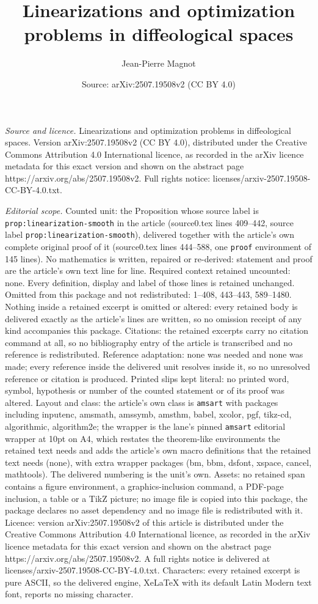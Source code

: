 \documentclass[10pt,a4paper]{amsart}
\title[Linearizations and optimization problems in diffeological sp]{Linearizations and optimization problems in diffeological spaces}
\author{Jean-Pierre Magnot}
\date{Source: arXiv:2507.19508v2 (CC BY 4.0)}
\begin{document}
\maketitle

\noindent\emph{Source and licence.} Linearizations and optimization problems in diffeological spaces. Version arXiv:2507.19508v2 (CC BY 4.0), distributed under the Creative Commons Attribution 4.0 International licence, as recorded in the arXiv licence metadata for this exact version and shown on the abstract page https://arxiv.org/abs/2507.19508v2. Full rights notice: licenses/arxiv-2507.19508-CC-BY-4.0.txt.\par\smallskip

\noindent\textit{Editorial scope.} Counted unit: the Proposition whose source label is \texttt{prop:linearization-smooth} in the article (source0.tex lines 409--442, source label \texttt{prop:linearization-smooth}), delivered together with the article's own complete original proof of it (source0.tex lines 444--588, one \texttt{proof} environment of 145 lines). No mathematics is written, repaired or re-derived: statement and proof are the article's own text line for line. Required context retained uncounted: none. Every definition, display and label of those lines is retained unchanged. Omitted from this package and not redistributed: 1--408, 443--443, 589--1480. Nothing inside a retained excerpt is omitted or altered: every retained body is delivered exactly as the article's lines are written, so no omission receipt of any kind accompanies this package. Citations: the retained excerpts carry no citation command at all, so no bibliography entry of the article is transcribed and no reference is redistributed. Reference adaptation: none was needed and none was made; every reference inside the delivered unit resolves inside it, so no unresolved reference or citation is produced. Printed slips kept literal: no printed word, symbol, hypothesis or number of the counted statement or of its proof was altered. Layout and class: the article's own class is \texttt{amsart} with packages including inputenc, amsmath, amssymb, amsthm, babel, xcolor, pgf, tikz-cd, algorithmic, algorithm2e; the wrapper is the lane's pinned \texttt{amsart} editorial wrapper at 10pt on A4, which restates the theorem-like environments the retained text needs and adds the article's own macro definitions that the retained text needs (none), with extra wrapper packages (bm, bbm, dsfont, xspace, cancel, mathtools). The delivered numbering is the unit's own. Assets: no retained span contains a figure environment, a graphics-inclusion command, a PDF-page inclusion, a table or a TikZ picture; no image file is copied into this package, the package declares no asset dependency and no image file is redistributed with it. Licence: version arXiv:2507.19508v2 of this article is distributed under the Creative Commons Attribution 4.0 International licence, as recorded in the arXiv licence metadata for this exact version and shown on the abstract page https://arxiv.org/abs/2507.19508v2. A full rights notice is delivered at licenses/arxiv-2507.19508-CC-BY-4.0.txt. Characters: every retained excerpt is pure ASCII, so the delivered engine, XeLaTeX with its default Latin Modern text font, reports no missing character.
\end{document}
